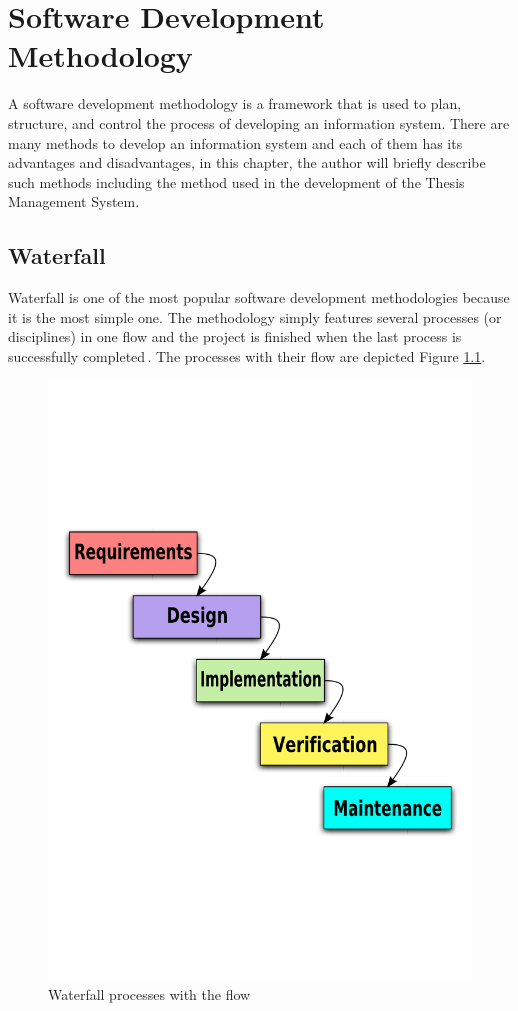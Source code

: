 \chapter{Software Development Methodology}

A software development methodology is a framework that is used to plan, structure, and control the process of developing an information system. There are many methods to develop an information system and each of them has its advantages and disadvantages, in this chapter, the author will briefly describe such methods including the method used in the development of the Thesis Management System.

\section{Waterfall}

Waterfall is one of the most popular software development methodologies because it is the most simple one. The methodology simply features several processes (or disciplines) in one flow and the project is finished when the last process is successfully completed\,\cite{agile-iterative-development}. The processes with their flow are depicted Figure \ref{fig:waterfall}.

\begin{figure}[htbp]
    \centering
        \includegraphics[trim=0 200 0 200, clip, keepaspectratio, width=\textwidth]{./images/waterfall.pdf}
    \caption{Waterfall processes with the flow\,\cite{waterfall-img-src}}
    \label{fig:waterfall}
\end{figure}

